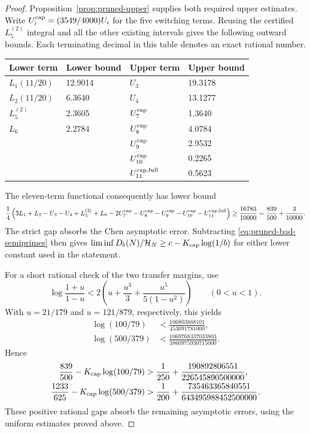 \documentclass[11pt]{article}
\newcommand{\HN}{\mathcal H_N}
\begin{document}
\begin{proof}
Proposition~\ref{prop:pruned-upper} supplies both required upper estimates. Write $U_i^{\rm cap}=(3549/4000)U_i$ for the five switching terms.
Reusing the certified $L_5^{(2)}$ integral and all the other existing
intervals gives the following outward bounds. Each terminating
decimal in this table denotes an exact rational number.
\begin{center}
\begin{tabular}{ll@{\qquad}ll}
\toprule
Lower term&Lower bound&Upper term&Upper bound\\
\midrule
$L_1(11/20)$&12.9014&$U_3$&19.3178\\
$L_2(11/20)$&6.3640&$U_4$&13.1277\\
$L_5^{(2)}$&2.3605&$U_7^{\rm cap}$&1.3640\\
$L_6$&2.2784&$U_8^{\rm cap}$&4.0784\\
&&$U_9^{\rm cap}$&2.9532\\
&&$U_{10}^{\rm cap}$&0.2265\\
&&$U_{11}^{{\rm cap},{\rm full}}$&0.5623\\
\bottomrule
\end{tabular}
\end{center}
The eleven-term functional consequently has lower bound
\[
 \frac14\left(3L_1+L_2-U_3-U_4+L_5^{(2)}+L_6
 -2U_7^{\rm cap}-U_8^{\rm cap}-U_9^{\rm cap}
 -U_{10}^{\rm cap}-U_{11}^{{\rm cap},{\rm full}}\right)
 \ge\frac{16783}{10000}
 =\frac{839}{500}+\frac3{10000}.
\]
The strict gap absorbs the Chen asymptotic error.
Subtracting \eqref{eq:pruned-bad-semiprimes} then gives
$\liminf D_b(N)/\HN\ge c-K_{\rm cap}\log(1/b)$ for either
lower constant used in the statement.

For a short rational check of the two transfer margins, use
\[
 \log\frac{1+u}{1-u}
 <2\left(u+\frac{u^3}{3}+\frac{u^5}{5(1-u^2)}\right)
 \qquad(0<u<1).
\]
With $u=21/179$ and $u=121/879$, respectively, this yields
\begin{align*}
 \log(100/79)&<\frac{106803868101}{453091781000},\\
 \log(500/379)&<\frac{1069768337033803}{3860975930715000}.
\end{align*}
Hence
\begin{align*}
 \frac{839}{500}-K_{\rm cap}\log(100/79)
 &>\frac1{250}
      +\frac{190892806551}{226545890500000},\\
 \frac{1233}{625}-K_{\rm cap}\log(500/379)
 &>\frac1{200}
      +\frac{735463365840551}{643495988452500000}.
\end{align*}
These positive rational gaps absorb the remaining asymptotic errors,
using the uniform estimates proved above.
\end{proof}
\end{document}
